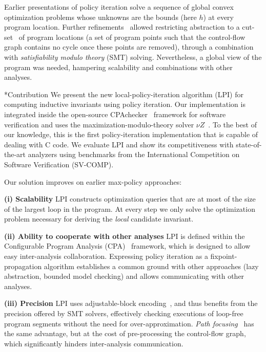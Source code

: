\documentclass{llncs}
\makeatletter
\renewcommand{\paragraph}{\@startsection{paragraph}{4}{\z@}{0.8ex \@plus 0ex \@minus 1ex}{-1em}{\normalfont\normalsize\bfseries}}
\makeatother
\begin{document}
Earlier presentations of policy iteration solve a sequence of global convex
optimization problems whose unknowns are the bounds (here $h$) at every
program location.
Further refinements~\cite{policy_iteration_path_focusing} allowed
restricting abstraction to a cut-set~\cite{cut_set}
of program locations (a set of program
points such that the control-flow graph contains no cycle once these points are
removed), through a combination with \emph{satisfiability modulo theory} (SMT)
solving.
Nevertheless, a global view of the program was
needed, hampering scalability and combinations with other analyses.

\paragraph*{Contribution}
We present the new local-policy-iteration algorithm (LPI) for
computing inductive invariants using policy iteration.
Our implementation is integrated inside the open-source
CPAchecker~\cite{cpachecker} framework for software verification
and uses the maximization-modulo-theory solver $\nu Z$~\cite{opt_z3}.
To the best of our knowledge, this is the first policy-iteration implementation
that is capable of dealing with C code.
We evaluate LPI and show its competitiveness with state-of-the-art analyzers
using benchmarks from the International Competition on Software Verification (SV-COMP).

Our solution improves on earlier max-policy approaches:

\noindent \textbf{(i) Scalability} LPI constructs optimization queries that are at most of
the size of the largest loop in the program.
At every step we only solve the optimization problem necessary for deriving the
\emph{local} candidate invariant.

\noindent \textbf{(ii) Ability to cooperate with other analyses}
LPI is defined within the Configurable Program Analysis (CPA)~\cite{cpa} framework,
which is designed to allow easy inter-analysis collaboration.
Expressing policy iteration as a fixpoint-propagation algorithm
establishes a common ground with other approaches (lazy abstraction, bounded
model checking) and allows communicating with other analyses.

\noindent \textbf{(iii) Precision} LPI uses adjustable-block
encoding~\cite{adjustable_block_encoding},
and thus benefits from the precision offered by SMT solvers,
effectively checking executions of loop-free program segments
without the need for over-approximation.
\emph{Path focusing}~\cite{policy_iteration_path_focusing} has the
same advantage, but at the cost of pre-processing the control-flow graph, which
significantly hinders inter-analysis communication.
\end{document}

